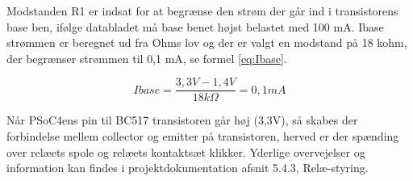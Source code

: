 Modstanden R1 er indsat for at begrænse den strøm der går ind i transistorens base ben, ifølge databladet må base benet højst belastet med 100 mA. Ibase strømmen er beregnet ud fra Ohms lov og der er valgt en modstand på 18 kohm, der begrænser strømmen til 0,1 mA, se formel \ref{eq:Ibase}.

\begin{equation} 
Ibase = \frac{3,3V - 1,4V}{18k\Omega} = 0,1mA
\label{eq:Ibase}
\end{equation} 

Når PSoC4ens pin til BC517 transistoren går høj (3,3V), så skabes der forbindelse mellem collector og emitter på transistoren, herved er der spænding over relæets spole og relæets kontaktsæt klikker. Yderlige overvejelser og information kan findes i projektdokumentation afsnit 5.4.3, Relæ-styring.





